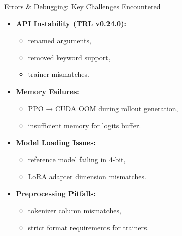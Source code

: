 \documentclass[10pt]{beamer}
\begin{document}
\begin{frame}{Errors \& Debugging: Key Challenges Encountered}
\large

\begin{itemize}
    \item<1-> \textbf{API Instability (TRL v0.24.0):}
    \begin{itemize}
        \item renamed arguments,
        \item removed keyword support,
        \item trainer mismatches.
    \end{itemize}

    \vspace{0.25cm}

    \item<1-> \textbf{Memory Failures:}
    \begin{itemize}
        \item PPO → CUDA OOM during rollout generation,
        \item insufficient memory for logits buffer.
    \end{itemize}

    \vspace{0.25cm}

    \item<2-> \textbf{Model Loading Issues:}
    \begin{itemize}
        \item reference model failing in 4-bit,
        \item LoRA adapter dimension mismatches.
    \end{itemize}

    \vspace{0.25cm}

    \item<2-> \textbf{Preprocessing Pitfalls:}
    \begin{itemize}
        \item tokenizer column mismatches,
        \item strict format requirements for trainers.
    \end{itemize}
\end{itemize}

\end{frame}
\end{document}
